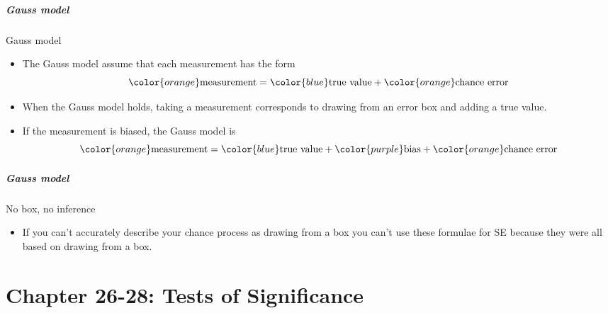 \documentclass[handout]{beamer}
\begin{document}

   \begin{frame} \frametitle{Gauss model}

   \begin{block}
     {Gauss model}
     \begin{itemize}
     \item The Gauss model assume that each measurement has the form
     $$
     {\color{orange} \text{measurement}} = {\color{blue} \text{true value}} + {\color{orange} \text{chance error}}
     $$
     \item When the Gauss model holds, taking a measurement corresponds
     to drawing from an {\color{orange} error box} and adding
     a {\color{blue} true value}.

     \item If the measurement is biased, the Gauss model is
     $$
     {\color{orange} \text{measurement}} = {\color{blue} \text{true value}} + {\color{purple} \text{bias}} + {\color{orange} \text{chance error}}
     $$

     \end{itemize}
   \end{block}
   \end{frame}


   \begin{frame} \frametitle{Gauss model}

   \begin{block}
     {No box, no inference}
     \begin{itemize}
     \item If you can't accurately describe your chance process as
     drawing from a box
     you can't use these formulae for SE because they were all
     based on drawing from a box.

     \end{itemize}
   \end{block}
   \end{frame}

   \part{Chapter 26-28: Tests of Significance}
   \frame{\partpage}

\end{document}
